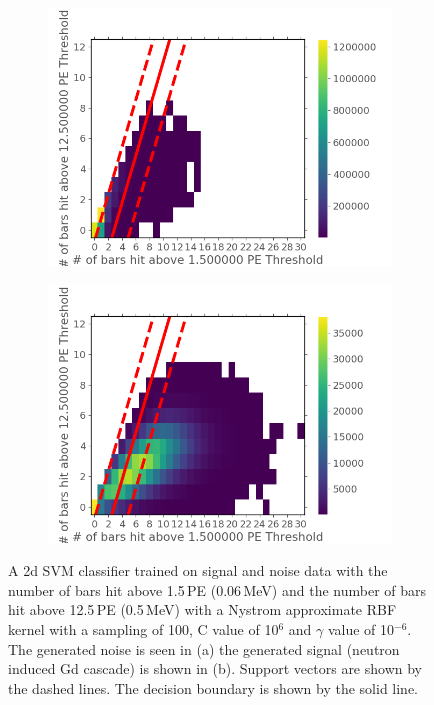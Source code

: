 \begin{figure}[!h]
\centering
\begin{subfigure}{.5\textwidth}
  \centering
  \includegraphics[width=\linewidth]{Chapter4/Figs/Raster/noiseNeutronSVM_C1e6_g1e-6.png}
  \captionsetup{width=.9\linewidth}
  \caption{}
  \label{subFig:noiseNeutronSVM_C1e6_g1e-6}
\end{subfigure}%
\begin{subfigure}{.5\textwidth}
  \centering
  \includegraphics[width=\linewidth]{Chapter4/Figs/Raster/signalNeutronSVM_C1e6_g1e-6.png}
  \captionsetup{width=.9\linewidth}
  \caption{}
  \label{subFig:signalNeutronSVM_C1e6_g1e-6}
\end{subfigure}
\caption{A 2d SVM classifier trained on signal and noise data with the number of bars hit above 1.5\,PE (0.06\,MeV) and the number of bars hit above 12.5\,PE (0.5\,MeV) with a Nystrom approximate RBF kernel with a sampling of 100, C value of 10$^6$ and $\gamma$ value of 10$^{-6}$. The generated noise is seen in (a) the generated signal (neutron induced Gd cascade) is shown in (b). Support vectors are shown by the dashed lines. The decision boundary is shown by the solid line.}
\label{fig:signalAndNoiseNeutronSVM_C1e6_g1e-6}
\end{figure}

